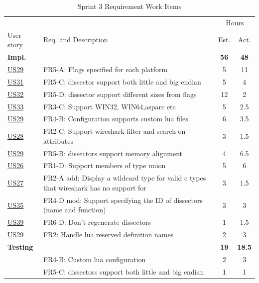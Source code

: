 \begin{table}[!htb] \small \center
\caption{Sprint 3 Requirement Work Items \label{tab:sprint3req}}
\begin{tabularx}{\textwidth}{l X c c}
	\toprule
	& & \multicolumn{2}{c}{Hours} \\
	\cmidrule(r){3-4}
	User story & Req. and Description & Est. & Act. \\
	\midrule
	\textbf{Impl.} &  & \textbf{56} & \textbf{48} \\
	\hyperref[tab:req:stories7]{US29} & FR5-A: Flags specified for each platform &  5  & 11 \\
	\hyperref[tab:req:stories8]{US31} & FR5-C: \Gls{dissector} support both little and big \gls{endian} & 5  & 4 \\
	\hyperref[tab:req:stories8]{US32} & FR5-D: \Gls{dissector} support different sizes from flags & 12  & 2 \\
	\hyperref[tab:req:stories8]{US33} & FR3-C: Support WIN32, WIN64,\gls{asparc} etc &  5  & 2.5 \\
	\hyperref[tab:req:stories7]{US29} & FR4-B: Configuration supports custom \Gls{lua} files & 6 & 3.5\\
	\hyperref[tab:req:stories7]{US28} & FR2-C: Support \Gls{wireshark} filter and search on attributes &  3 & 1.5\\
	\hyperref[tab:req:stories7]{US29} & FR5-B: \Glspl{dissector} support memory alignment & 4 & 6.5\\
	\hyperref[tab:req:stories7]{US26} & FR1-D: Support \glspl{member} of type \gls{union} & 5  & 6\\
	\hyperref[tab:req:stories7]{US27} & FR2-A add: Display a \gls{wildcard} type for valid \Gls{c} types that \Gls{wireshark} has no support for & 3  & 1.5\\
	\hyperref[tab:req:stories9]{US35} & FR4-D mod: Support specifying the ID of \glspl{dissector} (name and function) & 3  & 3 \\
	\hyperref[tab:req:stories9]{US39} & FR6-D: Don’t regenerate \glspl{dissector} & 1 & 1.5\\
	\hyperref[tab:req:stories7]{US29} & FR2: Handle \Gls{lua} reserved definition names & 2 & 3 \\
	\addlinespace
	\textbf{Testing} &  & \textbf{19} & \textbf{18.5} \\
	 & FR4-B: Custom \Gls{lua} configuration & 2 & 3\\
	 & FR5-C: \Glspl{dissector} support both little and big \gls{endian} & 1 & 1 \\

\end{tabularx}
\end{table}
